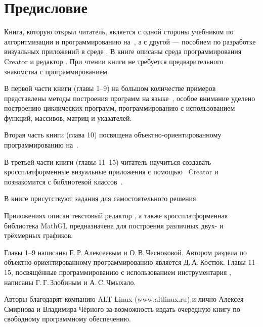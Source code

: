 

\chapter*{Предисловие}
Книга, которую открыл читатель, является с одной стороны учебником по алгоритмизации и программированию на~, а с
другой --- пособием по разработке визуальных приложений в среде . В книге описаны среда программирования~
Creator и редактор . При чтении книги не требуется предварительного знакомства с программированием. 

В первой части книги (главы 1--9) на большом количестве примеров представлены методы построения программ на языке~,
особое внимание уделено построению циклических программ, программированию с использованием функций, массивов, матриц и
указателей. 

Вторая часть книги (глава 10) посвящена объектно-ориентированному программированию на~. 

В третьей части книги (главы 11--15) читатель научиться создавать кроссплатформенные визуальные приложения с помощью~
Creator и познакомится с библиотекой классов~.

В книге присутствуют задания для самостоятельного решения.

Приложениях описан текстовый редактор , а также кросс\-платформенная библиотека MathGL предназначена для построения
различных двух- и трёхмерных графиков.

Главы 1--9 написаны Е.\,Р.\,Алексеевым и О.\,В.\,Чесноковой. Автором раздела по объектно-ориентированному программированию
является Д.\,А.\,Костюк. Главы 11--15, посвящённые программированию с использованием инструментария , написаны 
Г.\,Г.\,Злобиным и А.\,C.\,Чмыхало.

Авторы благодарят компанию ALT Linux (www.altlinux.ru) и лично Алексея Смирнова и Владимира Чёрного за  возможность
издать очередную книгу по свободному программному обеспечению.

%
